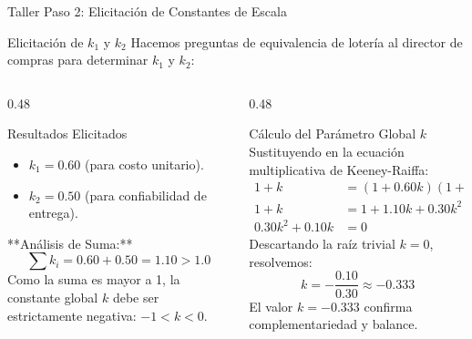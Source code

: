 \documentclass[aspectratio=169, 10pt]{beamer}
\begin{document}
\begin{frame}{Taller Paso 2: Elicitación de Constantes de Escala}
    \begin{block}{Elicitación de $k_1$ y $k_2$}
        Hacemos preguntas de equivalencia de lotería al director de compras para determinar $k_1$ y $k_2$:
    \end{block}
    \begin{columns}[T]
        \begin{column}{0.48\textwidth}
            \begin{exampleblock}{Resultados Elicitados}
                \scriptsize
                \begin{itemize}
                    \item $k_1 = 0.60$ (para costo unitario).
                    \item $k_2 = 0.50$ (para confiabilidad de entrega).
                \end{itemize}
                \vskip 5pt
                **Análisis de Suma:**
                \begin{equation*}
                    \sum k_i = 0.60 + 0.50 = 1.10 > 1.0
                \end{equation*}
                Como la suma es mayor a 1, la constante global $k$ debe ser estrictamente negativa: $-1 < k < 0$.
            \end{exampleblock}
        \end{column}
        
        \begin{column}{0.48\textwidth}
            \begin{block}{Cálculo del Parámetro Global $k$}
                \scriptsize
                Sustituyendo en la ecuación multiplicativa de Keeney-Raiffa:
                \begin{align*}
                    1 + k &= (1 + 0.60 k)(1 + 0.50 k) \\
                    1 + k &= 1 + 1.10 k + 0.30 k^2 \\
                    0.30 k^2 + 0.10 k &= 0
                \end{align*}
                Descartando la raíz trivial $k=0$, resolvemos:
                \begin{equation*}
                    k = -\frac{0.10}{0.30} \approx -0.333
                \end{equation*}
                El valor $k = -0.333$ confirma complementariedad y balance.
            \end{block}
        \end{column}
    \end{columns}
\end{frame}
\end{document}

